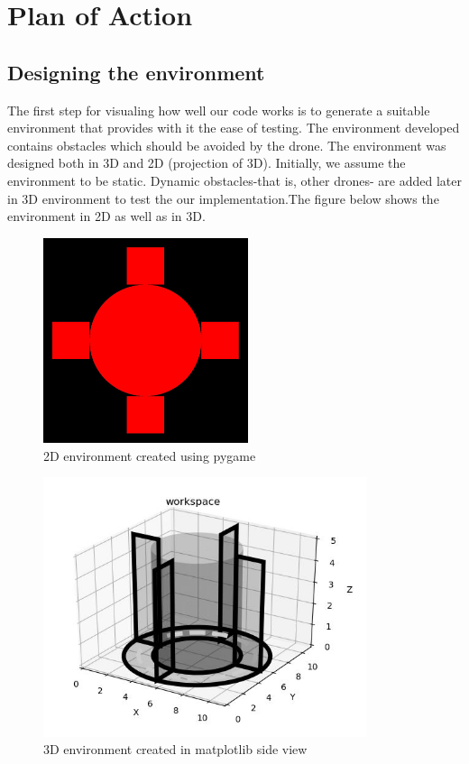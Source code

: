 \documentclass{IEEEtran}
\begin{document}
\section{\textbf{Plan of Action}}
\subsection{\textbf{Designing the environment}} 
The first step for visualing how well our code works is to generate a suitable environment that provides with it the ease of testing. 
The environment developed contains obstacles which should be avoided by the drone. The environment was designed both in 
3D and 2D (projection of 3D). Initially, we assume the environment to be static. Dynamic obstacles-that is, other drones- are added later in 3D environment to test the our implementation.The figure below shows the environment in 2D as well as in 3D.
\begin{figure}[h]
    \centering
    \includegraphics[width=6cm]{2dpygame}
    \caption{2D environment created using pygame}
    \label{fig:2D environment created using pygame}
\end{figure}
\begin{figure}[h]
    \centering
    \includegraphics[width=9.5cm]{3dmatplotlib}
    \caption{3D environment created in matplotlib side view}
    \label{fig:3D environment created in matplotlib}
\end{figure}
\end{document}
